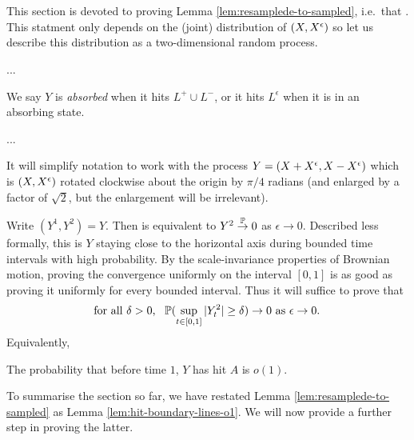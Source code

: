 {
\section{}
\label{sec:proof-of-lem:resamplede-to-sampled}

\newcommand{\bandwidth}{\delta}
\newcommand{\rotproc}{Y}

\newcommand{\union}{\cup}
\renewcommand{\L}{L^+ \union L^-}
\newcommand{\Le}{L^\epsilon}

This section is devoted to proving Lemma
\ref{lem:resamplede-to-sampled}, i.e.\ that
\statementoflemresampledetosampled.  This statment only depends on the
(joint) distribution of $(\sampled, \resamplede)$ so let us describe this
distribution as a two-dimensional random process.

...

\begin{definition}
  We say $Y$ is \emph{absorbed} when it hits $\L$, or it hits $\Le$
  when it is in an absorbing state.
\end{definition}

...

It will simplify notation to work with the process $\rotproc =
(\sampled + \resamplede, \sampled - \resamplede)$ which is $(\sampled,
\resamplede)$ rotated clockwise about the origin by $\pi / 4$ radians (and enlarged by a factor of
$\sqrt{2}$, but the enlargement will be irrelevant).

Write $(\rotproc^1, \rotproc^2) = Y$.
Then \statementoflemresampledetosampled{} is equivalent to $\rotproc^2
\toinP 0$ as $\epsilon \to 0$.
Described less formally, this is $\rotproc$ staying close to the
horizontal axis during bounded time intervals with high probability.
By the scale-invariance properties of Brownian motion, proving the
convergence uniformly on the interval $[0,1]$ is as good as proving it
uniformly for every bounded interval.  Thus it will suffice to prove that
\[\text{
  for all $\delta > 0$, \, $\P(\sup_{t \in [0,1]} |Y^2_t| \ge \delta) \to 0$ as $\epsilon
  \to 0$.
}\]
\newcommand{\boundarylines}{A}
Equivalently,
\FIXME{}{Introduce $\boundarylines$}

\begin{lemma}
  \label{lem:hit-boundary-lines-o1}
  The probability that before time $1$, $Y$ has hit $\boundarylines$
  is $o(1)$.
\end{lemma}

To summarise the section so far, we have restated Lemma
\ref{lem:resamplede-to-sampled}
as Lemma
\ref{lem:hit-boundary-lines-o1}.  We will now provide a further step
in proving the latter.

}

